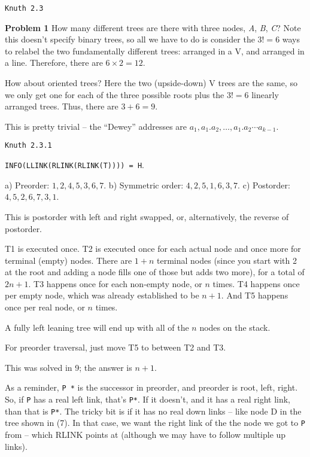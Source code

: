 \vskip 0.5in
\centerline {\tt Knuth 2.3}
\vskip 0.3in

\noindent
{\bf Problem 1} How many different trees are there with three nodes, {\it A}, {\it B},
{\it C}?  Note this doesn't specify binary trees, so all we have to do is consider
the $3!=6$ ways to relabel the two fundamentally different trees: arranged in a V, and
arranged in a line.  Therefore, there are $6 \times 2 = 12$.

\vskip 0.1in
 How about oriented trees?  Here the two (upside-down)
V trees are the same, so we only get one for each of the three possible roots
plus the $3! = 6$ linearly arranged trees.  Thus, there are $3 + 6 = 9$.

\vskip 0.1in
 This is pretty trivial -- the ``Dewey'' addresses are
$a_1, a_1 . a_2, \ldots, a_1 . a_2 \cdots a_{k-1}$.

\vskip 0.5in
\centerline {\tt Knuth 2.3.1}
\vskip 0.3in

 {\tt INFO(LLINK(RLINK(RLINK(T)))) = H}.

\vskip 0.1in  a) Preorder: $1, 2, 4, 5, 3, 6, 7$.
b) Symmetric order: $4, 2, 5, 1, 6, 3, 7$. c) Postorder: $4, 5, 2, 6, 7, 3, 1$.

\vskip 0.1in  This is postorder with left and right
swapped, or, alternatively, the reverse of postorder.

\vskip 0.1in  T1 is executed once. T2 is 
executed once for each actual node and once more for terminal (empty) nodes.
There are $1 + n$ terminal nodes (since you start with 2 at the root and adding
a node fills one of those but adds two more), for a total of $2 n + 1$.
T3 happens once for each non-empty node, or $n$ times.  T4 happens 
once per empty node, which was already established to be $n + 1$.
And T5 happens once per real node, or $n$ times.

\vskip 0.1in  A fully left leaning tree will end up
with all of the $n$ nodes on the stack.

\vskip 0.1in  For preorder traversal, just
move T5 to between T2 and T3.

\vskip 0.1in  This was solved in 9; the answer
is $n + 1$.

\vskip 0.1in  As a reminder, {\tt P *} is the
successor in preorder, and preorder is root, left, right.  So, if {\tt P}
has a real left link, that's {\tt P*}.  If it doesn't, and it has a real right
link, than that is {\tt P*}.  The tricky bit is if it has no real down links --
like node D in the tree shown in (7).  In that case, we want the
right link of the the node we got to {\tt P} from -- which RLINK points
at (although we may have to follow multiple up links).


